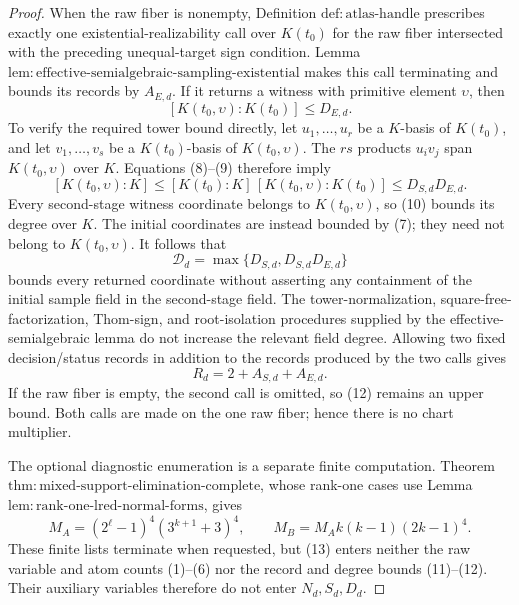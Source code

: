 \documentclass{article}
\begin{document}
\begin{proof}
When the raw fiber is nonempty, Definition \(\mathrm{def{:}atlas\text{-}handle}\) prescribes exactly one existential-realizability call over \(K(t_0)\) for the raw fiber intersected with the preceding unequal-target sign condition.  Lemma \(\mathrm{lem{:}effective\text{-}semialgebraic\text{-}sampling\text{-}existential}\) makes this call terminating and bounds its records by \(A_{E,d}\).  If it returns a witness with primitive element \(\upsilon\), then
\[
[K(t_0,\upsilon):K(t_0)]\le D_{E,d}.                       \tag{9}
\]
To verify the required tower bound directly, let \(u_1,\ldots,u_r\) be a \(K\)-basis of \(K(t_0)\), and let \(v_1,\ldots,v_s\) be a \(K(t_0)\)-basis of \(K(t_0,\upsilon)\).  The \(rs\) products \(u_iv_j\) span \(K(t_0,\upsilon)\) over \(K\).  Equations (8)--(9) therefore imply
\[
[K(t_0,\upsilon):K]
\le [K(t_0):K]\,[K(t_0,\upsilon):K(t_0)]
\le D_{S,d}D_{E,d}.                                      \tag{10}
\]
Every second-stage witness coordinate belongs to \(K(t_0,\upsilon)\), so (10) bounds its degree over \(K\).  The initial coordinates are instead bounded by (7); they need not belong to \(K(t_0,\upsilon)\).  It follows that
\[
\mathcal D_d=\max\{D_{S,d},D_{S,d}D_{E,d}\}              \tag{11}
\]
bounds every returned coordinate without asserting any containment of the initial sample field in the second-stage field.  The tower-normalization, square-free-factorization, Thom-sign, and root-isolation procedures supplied by the effective-semialgebraic lemma do not increase the relevant field degree.  Allowing two fixed decision/status records in addition to the records produced by the two calls gives
\[
R_d=2+A_{S,d}+A_{E,d}.                                    \tag{12}
\]
If the raw fiber is empty, the second call is omitted, so (12) remains an upper bound.  Both calls are made on the one raw fiber; hence there is no chart multiplier.

The optional diagnostic enumeration is a separate finite computation.  Theorem \(\mathrm{thm{:}mixed\text{-}support\text{-}elimination\text{-}complete}\), whose rank-one cases use Lemma \(\mathrm{lem{:}rank\text{-}one\text{-}lred\text{-}normal\text{-}forms}\), gives
\[
M_A=(2^{\ell}-1)^4(3^{k+1}+3)^4,
\qquad
M_B=M_Ak(k-1)(2k-1)^4.                                   \tag{13}
\]
These finite lists terminate when requested, but (13) enters neither the raw variable and atom counts (1)--(6) nor the record and degree bounds (11)--(12).  Their auxiliary variables therefore do not enter \(N_d,S_d,D_d\).


\end{proof}
\end{document}
